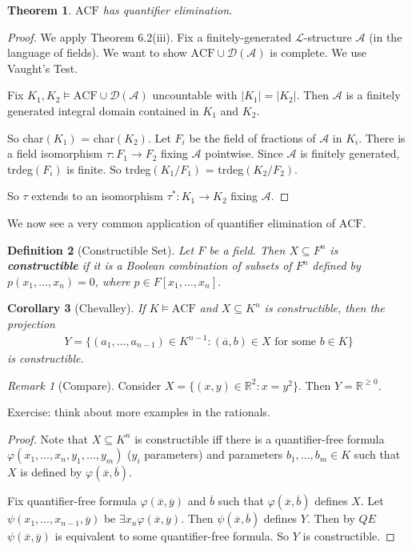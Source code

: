 \documentclass[]{article}
\theoremstyle{custhm}
\newtheorem{theorem}{Theorem}[section]
\theoremstyle{cusdef}
\newtheorem{defin}[theorem]{Definition}
\theoremstyle{custhm}
\theoremstyle{custhm}
\newtheorem{cor}[theorem]{Corollary}
\theoremstyle{custhm}
\theoremstyle{ex}
\theoremstyle{custhm}
\theoremstyle{cusdef}
\theoremstyle{remark}
\newtheorem*{remark*}{Remark}
\theoremstyle{remark}
\theoremstyle{numremark}
\newcommand{\R}{\mathbb{R}}
\newcommand{\ra}{\rightarrow}
\newcommand{\undf}[1]{\textit{\textbf{#1}}}
\renewcommand{\L}{\mathcal{L}}
\renewcommand{\phi}{\varphi}
\renewcommand{\bar}{\overline}
\newcommand{\acf}{\textrm{ACF}}
\newcommand{\A}{\mathcal{A}}
\newcommand{\D}{\mathcal{D}}
\renewcommand{\subset}{\subseteq}
\begin{document}
\begin{theorem}
$\acf$ has quantifier elimination.
\end{theorem}
\begin{proof}
We apply Theorem 6.2(iii). Fix a finitely-generated $\L$-structure $\A$ (in the language of fields). We want to show $\acf\cup \D(\A)$ is complete. We use Vaught's Test.

Fix $K_1,K_2\models\acf\cup \D(\A)$ uncountable with $|K_1| = |K_2|$. Then $\A$ is a finitely generated integral domain contained in $K_1$ and $K_2$.

So char$(K_1)$ = char\((K_2)\). Let $F_i$ be the field of fractions of $\A$ in $K_i$. There is a field isomorphism $\tau : F_1\ra F_2$ fixing $\A$ pointwise. Since $\A$ is finitely generated, trdeg$(F_i)$ is finite. So trdeg$(K_1/F_1)$ = trdeg$(K_2/F_2)$.

So $\tau$ extends to an isomorphism $\tau^\ast: K_1\ra K_2$ fixing $\A$.
\end{proof}
We now see a very common application of quantifier elimination of $\acf$.

\begin{defin}[Constructible Set]
Let $F$ be a field. Then $X\subset F^n$ is \undf{constructible} if it is a Boolean combination of subsets of $F^n$ defined by $p(x_1,\dots,x_n) = 0$, where $p \in F[x_1,\dots,x_n]$.
\end{defin}
\begin{cor}[Chevalley]
If $K\models \acf$ and $X\subset K^n$ is constructible, then the projection
\begin{align*}
Y = \{(a_1,\dots,a_{n-1})\in K^{n-1}:(\overline{a},b)\in X\textrm{ for some }b\in K\}
\end{align*}
is constructible.
\end{cor}

\begin{remark*}[Compare]
Consider $X = \{(x,y)\in \R^2:x = y^2\}$. Then $Y = \R^{\ge 0}$.

Exercise: think about more examples in the rationals.
\end{remark*}
\begin{proof}
Note that $X\subset K^n$ is constructible iff there is a quantifier-free formula $\phi(x_1,\dots,x_n,y_1,\dots,y_m)$ ($y_i$ parameters) and parameters $b_1,\dots,b_m\in K$ such that $X$ is defined by $\phi(\bar{x},\bar{b})$.

Fix quantifier-free formula $\phi(\bar{x},\bar{y})$ and $\bar{b}$ such that $\phi(\bar{x},\bar{b})$ defines $X$. Let $\psi(x_1,\dots,x_{n-1},\bar{y})$ be $\exists x_n\phi(\bar{x},\bar{y})$. Then $\psi(\bar{x},\bar{b})$ defines $Y$. Then by $QE$ $\psi(\bar{x},\bar{y})$ is equivalent to some quantifier-free formula. So $Y$ is constructible.
\end{proof}
\end{document}
